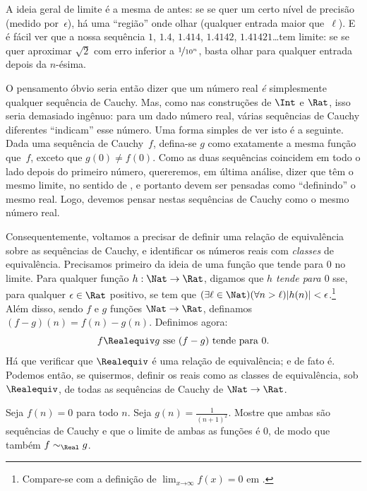 \documentclass[../../../include/open-logic-section]{subfiles}
\begin{document}
A ideia geral de limite é a mesma de antes: se se quer um certo nível de
precisão (medido por~$\epsilon$), há uma ``região'' onde olhar (qualquer entrada
maior que~$\ell$). E é fácil ver que a nossa sequência $1$, $1.4$, $1.414$,
$1.4142$, $1.41421$\ldots tem limite: se se quer aproximar $\sqrt{2}$ com erro
inferior a $\nicefrac{1}{10^{n}}$, basta olhar para qualquer entrada depois da
$n$-ésima.

O pensamento óbvio seria então dizer que um número real \emph{é} simplesmente
qualquer sequência de Cauchy. Mas, como nas construções de $\Int$ e $\Rat$, isso
seria demasiado ingênuo: para um dado número real, várias sequências de Cauchy
diferentes ``indicam'' esse número. Uma forma simples de ver isto é a seguinte.
Dada uma sequência de Cauchy~$f$, defina-se $g$ como exatamente a mesma
função que~$f$, exceto que $g(0)\neq f(0)$. Como as duas sequências coincidem
em todo o lado depois do primeiro número, quereremos, em última análise, dizer
que têm o mesmo limite, no sentido de ,
e portanto devem ser pensadas como ``definindo'' o mesmo real. Logo, devemos
pensar nestas sequências de Cauchy como o mesmo número real.

Consequentemente, voltamos a precisar de definir uma relação de equivalência sobre
as sequências de Cauchy, e identificar os números reais com \emph{classes} de
equivalência. Precisamos primeiro da ideia de uma função que tende para $0$ no
limite. Para qualquer função $h : \Nat \to \Rat$, digamos que \emph{$h$ tende
para $0$} sse, para qualquer $\epsilon \in \Rat$ positivo, se tem que
$(\exists \ell \in \Nat)(\forall n > \ell)|h(n)| <
\epsilon$.\footnote{Compare-se com a definição de $\lim_{x
\mathord{\rightarrow}\infty}f(x) = 0$ em
.} Além disso, sendo $f$ e $g$ funções $\Nat \to \Rat$, definamos $(f-g)(n) = f(n) - g(n)$. Definimos agora:
\[
	f \Realequiv g \text{ sse $(f-g)$ tende para $0$}.
\]
Há que verificar que $\Realequiv$ é uma relação de equivalência; e de fato é.
Podemos então, se quisermos, definir os reais como as classes de equivalência,
sob $\Realequiv$, de todas as sequências de Cauchy de $\Nat \to \Rat$.

\begin{prob}
Seja $f(n) = 0$ para todo $n$. Seja $g(n) = \frac{1}{(n+1)^2}$. Mostre
que ambas são sequências de Cauchy e que o limite de ambas as funções é $0$, de
modo que também $f \sim_\Real g$. 
\end{prob}
\end{document}
